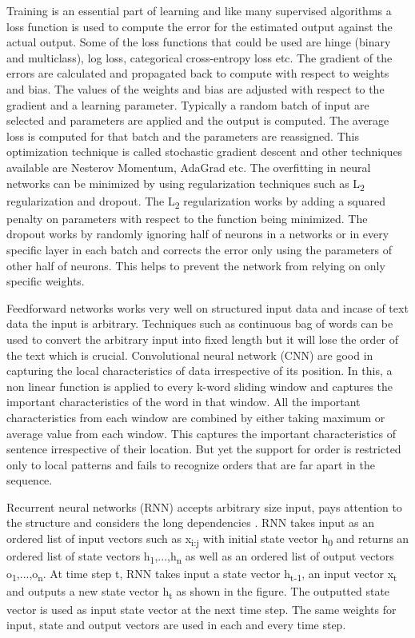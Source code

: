 \documentclass[a4paper, 11pt]{article}
\begin{document}
Training is an essential part of learning and like many supervised algorithms a loss function is used to compute the error for the estimated output against the actual output. Some of the loss functions that could be used are hinge (binary and multiclass), log loss, categorical cross-entropy loss etc. The gradient of the errors are calculated and propagated back to compute with respect to weights and bias. The values of the weights and bias are adjusted with respect to the gradient and a learning parameter. Typically a random batch of input are selected and parameters are applied and the output is computed. The average loss is computed for that batch and the parameters are reassigned. This optimization technique is called stochastic gradient descent \cite{Bottou2012} and other techniques available are Nesterov Momentum, AdaGrad etc. The overfitting in neural networks can be minimized by using regularization techniques such as L\textsubscript{2} regularization and dropout\cite{Hinton2012}. The L\textsubscript{2} regularization works by adding a squared penalty on parameters with respect to the function being minimized. The dropout works by randomly ignoring half of neurons in a networks or in every specific layer in each batch and corrects the error only using the parameters of other half of neurons. This helps to prevent the network from relying on only specific weights. 

Feedforward networks works very well on structured input data and incase of text data the input is arbitrary. Techniques such as continuous bag of words can be used to convert the arbitrary input into fixed length but it will lose the order of the text which is crucial. Convolutional neural network (CNN) \cite{Bengio1997} are good in capturing the local characteristics of data irrespective of its position. In this, a non linear function is applied to every k-word sliding window and captures the important characteristics of the word in that window. All the important characteristics from each window are combined by either taking maximum or average value from each window. This captures the important characteristics of sentence irrespective of their location. But yet the support for order is restricted only to local patterns and fails to recognize orders that are far apart in the sequence.

Recurrent neural networks (RNN) accepts arbitrary size input, pays attention to the structure and considers the long dependencies \cite{Elman}. RNN takes input as an ordered list of input vectors such as x\textsubscript{i:j} with initial state vector h\textsubscript{0} and returns an ordered list of state vectors h\textsubscript{1},...,h\textsubscript{n} as well as an ordered list of output vectors o\textsubscript{1},...,o\textsubscript{n}. At time step t, RNN takes input a state vector h\textsubscript{t-1}, an input vector x\textsubscript{t} and outputs a new state vector h\textsubscript{t} as shown in the figure. The outputted state vector is used as input state vector at the next time step. The same weights for input, state and output vectors are used in each and every time step.   
\end{document}
